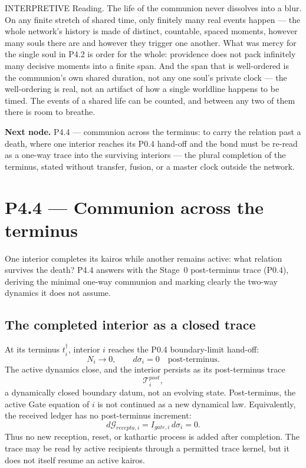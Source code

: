 \documentclass[11pt,a4paper]{article}
\def\mathrm#1{#1}%
\def\emph#1{#1}%
\newcommand{\stInterp}{\textcolor{cInt}{\textsf{\small INTERPRETIVE}}}
\theoremstyle{definition}
\theoremstyle{plain}
\theoremstyle{remark}
\begin{document}
\medskip
\stInterp\quad
\emph{Reading.}
The life of the communion never dissolves into a blur. On any finite stretch of shared time,
only finitely many real events happen --- the whole network's history is made of distinct,
countable, spaced moments, however many souls there are and however they trigger one another.
What was mercy for the single soul in P4.2 is order for the whole: providence does not pack
infinitely many decisive moments into a finite span. And the span that is well-ordered is the
communion's own shared duration, not any one soul's private clock --- the well-ordering is
real, not an artifact of how a single worldline happens to be timed. The events of a shared
life can be counted, and between any two of them there is room to breathe.

\medskip
\textbf{Next node.} P4.4 --- communion across the terminus: to carry the relation past a
death, where one interior reaches its P0.4 hand-off and the bond must be re-read as a
one-way trace into the surviving interiors --- the plural completion of the terminus, stated
without transfer, fusion, or a master clock outside the network.

\section{P4.4 --- Communion across the terminus}

One interior completes its kairos while another remains active: what relation survives the
death? P4.4 answers with the Stage~0 post-terminus trace (P0.4), deriving the minimal
one-way communion and marking clearly the two-way dynamics it does not assume.

\subsection{The completed interior as a closed trace}

At its terminus \(t_i^\dagger\), interior \(i\) reaches the P0.4 boundary-limit
hand-off:
\[
N_i\to0,
\qquad
d\sigma_i=0
\quad
\text{post-terminus}.
\]
The active dynamics close, and the interior persists as its post-terminus trace
\[
\mathcal T_i^{\mathrm{post}},
\]
a dynamically closed boundary datum, not an evolving state.
Post-terminus, the active Gate equation of \(i\) is not continued as a new
dynamical law. Equivalently, the received ledger has no post-terminus increment:
\[
d\mathcal G_{\mathrm{recepta},i}
=
I_{\mathrm{gate},i}\,d\sigma_i
=
0.
\]
Thus no new reception, reset, or kathartic process is added after completion. The
trace may be read by active recipients through a permitted trace kernel, but it
does not itself resume an active kairos.
\end{document}
